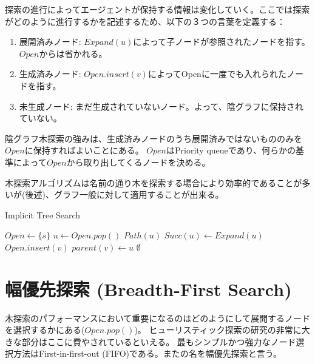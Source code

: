 \documentclass{report}
\begin{document}
探索の進行によってエージェントが保持する情報は変化していく。ここでは探索がどのように進行するかを記述するため、以下の３つの言葉を定義する：

\begin{enumerate}
\item 展開済みノード: $Expand(u)$によって子ノードが参照されたノードを指す。$Open$からは省かれる。
\item 生成済みノード: $Open.insert(v)$によってOpenに一度でも入れられたノードを指す。
\item 未生成ノード: まだ生成されていないノード。よって、陰グラフに保持されていない。

\end{enumerate}

陰グラフ木探索の強みは、生成済みノードのうち展開済みではないもののみを$Open$に保持すればよいことにある。
$Open$はPriority queueであり、何らかの基準によって$Open$から取り出してくるノードを決める。

木探索アルゴリズムは名前の通り木を探索する場合により効率的であることが多いが(後述)、グラフ一般に対して適用することが出来る。




\begin{algorithm}
\caption{Implicit Tree Search}
\label{alg:implicit-tree-search}
	$Open \leftarrow \{s\}$\;
	 {
		$u \leftarrow Open.pop()$\;
		 {
			\Return $Path(u)$\;
		}
		$Succ(u) \leftarrow Expand(u)$\;
		 {
			$Open.insert(v)$\;
			$parent(v) \leftarrow u$\;
		}
 	}
	\Return $\emptyset$\;
\end{algorithm}





\section{幅優先探索 (Breadth-First Search)}
\label{sec:breadth-first-search}

木探索のパフォーマンスにおいて重要になるのはどのようにして展開するノードを選択するかにある($Open.pop()$)。
ヒューリスティック探索の研究の非常に大きな部分はここに費やされているといえる。
最もシンプルかつ強力なノード選択方法はFirst-in-first-out (FIFO)である。またの名を幅優先探索と言う。
\end{document}
